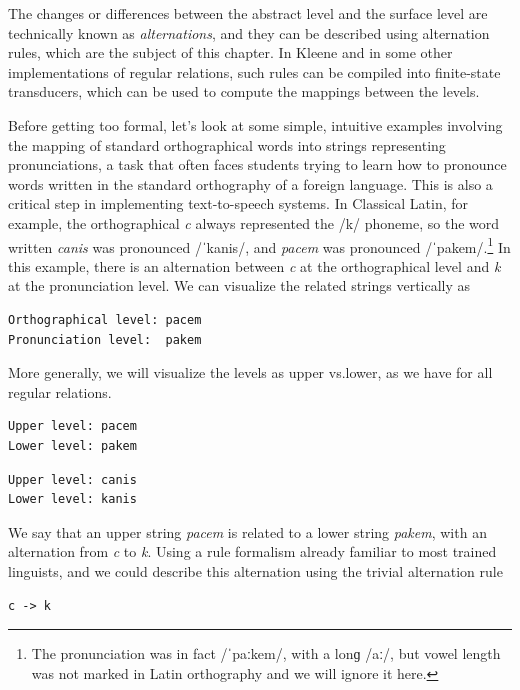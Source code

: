 \noindent
The changes or differences between the abstract level and the surface level are
technically known as \emph{alternations}, and they can be described using alternation rules, which are the
subject of this chapter.  In
Kleene and in some other implementations of regular relations, 
such rules can be compiled into finite-state transducers, which can be
used to compute the mappings between the levels.

Before getting too formal, let's look at some simple, intuitive examples involving the
mapping of standard
orthographical words into strings representing pronunciations, a task that often faces students trying
to learn how to pronounce words written in the standard orthography of a
foreign language.  This is also a critical step in implementing
text-to-speech systems.  In Classical
Latin, for example, the orthographical \emph{c} always represented
the /k/ phoneme, so the word written \emph{canis} was
pronounced /ˈkanis/, and \emph{pacem} was pronounced
/ˈpakem/.\footnote{The pronunciation was in fact /ˈpaːkem/, with a lonɡ
/aː/, but vowel length was not marked in Latin orthography and we will
ignore it here.} In this example,
there is an alternation between \emph{c} at the orthographical level and
\emph{k} at the pronunciation level.  We can visualize the related strings vertically as

\begin{Verbatim}
Orthographical level: pacem
Pronunciation level:  pakem
\end{Verbatim}

\noindent
More generally, we will visualize the levels as upper vs.\@ lower, as we have for all regular
relations.

\begin{Verbatim}
Upper level: pacem
Lower level: pakem
\end{Verbatim}

\begin{Verbatim}
Upper level: canis
Lower level: kanis
\end{Verbatim}

\noindent
We say that an upper string \emph{pacem} is related to a lower string
\emph{pakem}, with an alternation from \emph{c} to \emph{k}.
Using a rule formalism already familiar to most trained linguists, and we could describe this alternation
using the trivial alternation rule

\begin{Verbatim}
c -> k
\end{Verbatim}

